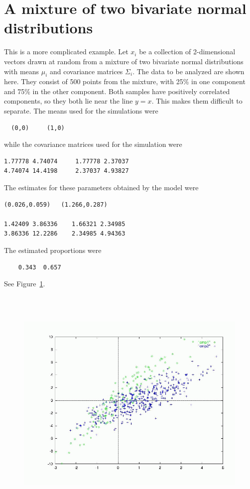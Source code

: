 \section{A mixture of two bivariate normal distributions}

This is a more complicated example.
Let $x_i$ be a collection of 2-dimensional vectors drawn  
at random from a mixture of two bivariate normal distributions with
means $\mu_i$ and covariance matrices $\Sigma_i$.
The data to be analyzed are shown here. They consist of 500
points from the mixture, with 25\% in one component and 75\% in the other
component. Both samples have positively correlated components, so
they both lie near the line $y=x$.
This makes them difficult to separate.
The means used for the simulations were
\begin{lstlisting}
  (0,0)     (1,0)
\end{lstlisting}
while the covariance matrices used for the simulation were
\begin{lstlisting}
1.77778 4.74074     1.77778 2.37037
4.74074 14.4198     2.37037 4.93827
\end{lstlisting}
The estimates for these parameters obtained by the model were
\begin{lstlisting}
(0.026,0.059)   (1.266,0.287)

1.42409 3.86336    1.66321 2.34985
3.86336 12.2286    2.34985 4.94363
\end{lstlisting}

The estimated proportions were
\begin{lstlisting}
    0.343  0.657
\end{lstlisting}
See Figure~\ref{fig:estimatedprop}.
\begin{figure}[h]
  \includegraphics[height=4.5in, width=\textwidth]{datax.png}
  \emptycaption
  \label{fig:estimatedprop}
\end{figure}

